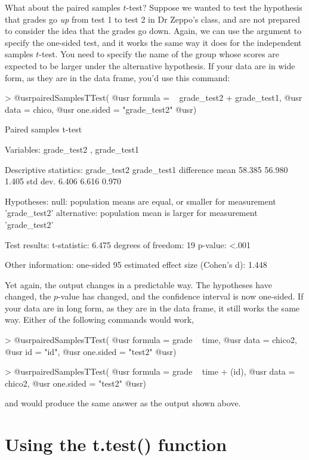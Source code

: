 What about the paired samples $t$-test? Suppose we wanted to test the hypothesis that grades go {\it up} from test 1 to test 2 in Dr Zeppo's class, and are not prepared to consider the idea that the grades go down. Again, we can use the  argument to specify the one-sided test, and it works the same way it does for the independent samples $t$-test. You need to specify the name of the group whose scores are expected to be larger under the alternative hypothesis. If your data are in wide form, as they are in the  data frame, you'd use this command:
\begin{rblock1}
> @usr{pairedSamplesTTest(} 
  @usr{   formula = ~ grade_test2 + grade_test1, }
  @usr{   data = chico,} 
  @usr{   one.sided = "grade_test2"} 
  @usr{)}

   Paired samples t-test 

Variables:  grade_test2 , grade_test1 

Descriptive statistics: 
            grade_test2 grade_test1 difference
   mean          58.385      56.980      1.405
   std dev.       6.406       6.616      0.970

Hypotheses: 
   null:        population means are equal, or smaller for measurement 'grade_test2' 
   alternative: population mean is larger for measurement 'grade_test2' 

Test results: 
   t-statistic:  6.475 
   degrees of freedom:  19 
   p-value:  <.001 

Other information: 
   one-sided 95%
   estimated effect size (Cohen's d):  1.448 
\end{rblock1}
Yet again, the output changes in a predictable way. The hypotheses have changed, the $p$-value has changed, and the confidence interval is now one-sided. If your data are in long form, as they are in the  data frame, it still works the same way. Either of the following commands would work,
\begin{rblock1}
> @usr{pairedSamplesTTest( }
  @usr{  formula = grade ~ time,} 
  @usr{  data = chico2, }
  @usr{  id = "id", }
  @usr{  one.sided = "test2"} 
  @usr{)}

> @usr{pairedSamplesTTest( }
  @usr{  formula = grade ~ time + (id), }
  @usr{  data = chico2, }
  @usr{  one.sided = "test2"} 
  @usr{)}
\end{rblock1}
and would produce the same answer as the output shown above.


\section{Using the t.test() function\label{sec:ttestfunction}}

